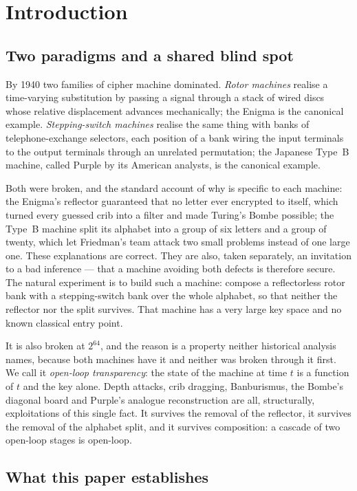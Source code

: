 \documentclass[11pt]{article}
\theoremstyle{definition}
\begin{document}
\section{Introduction}

\subsection{Two paradigms and a shared blind spot}

By 1940 two families of cipher machine dominated. \emph{Rotor machines} realise a
time-varying substitution by passing a signal through a stack of wired discs
whose relative displacement advances mechanically; the Enigma is the canonical
example. \emph{Stepping-switch machines} realise the same thing with banks of
telephone-exchange selectors, each position of a bank wiring the input terminals
to the output terminals through an unrelated permutation; the Japanese Type~B
machine, called Purple by its American analysts, is the canonical example.

Both were broken, and the standard account of why is specific to each machine:
the Enigma's reflector guaranteed that no letter ever encrypted to itself, which
turned every guessed crib into a filter and made Turing's Bombe possible; the
Type~B machine split its alphabet into a group of six letters and a group of
twenty, which let Friedman's team attack two small problems instead of one large
one. These explanations are correct. They are also, taken separately, an
invitation to a bad inference --- that a machine avoiding both defects is
therefore secure. The natural experiment is to build such a machine: compose a
reflectorless rotor bank with a stepping-switch bank over the whole alphabet,
so that neither the reflector nor the split survives. That machine has a very
large key space and no known classical entry point.

It is also broken at $2^{64}$, and the reason is a property neither historical
analysis names, because both machines have it and neither was broken through it
first. We call it \emph{open-loop transparency}: the state of the machine at
time $t$ is a function of $t$ and the key alone. Depth attacks, crib dragging,
Banburismus, the Bombe's diagonal board and Purple's analogue reconstruction are
all, structurally, exploitations of this single fact. It survives the removal of
the reflector, it survives the removal of the alphabet split, and it survives
composition: a cascade of two open-loop stages is open-loop.

\subsection{What this paper establishes}
\end{document}
